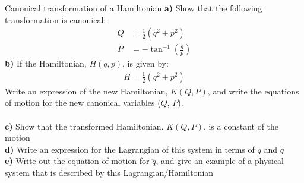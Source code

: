 \begin{problem}{Canonical transformation of a Hamiltonian}
\textbf{a)} Show that the following transformation is canonical:
\begin{align*}
Q&=\frac{1}{2}(q^2+p^2)\\
P&=-\tan^{-1}(\frac{q}{p})
\end{align*}
\textbf{b)} If the Hamiltonian, $H(q,p)$, is given by:
\begin{align*}
H=\frac{1}{2}(q^2+p^2)
\end{align*}
Write an expression of the new Hamiltonian, $K(Q,P)$, and write the equations of motion for the new canonical variables ($Q$, $P$).\\\\
\textbf{c)} Show that the transformed Hamiltonian, $K(Q,P)$, is a constant of the motion\\
\textbf{d)} Write an expression for the Lagrangian of this system in terms of $q$ and $\dot q$\\
\textbf{e)} Write out the equation of motion for $\ddot q$, and give an example of a physical system that is described by this Lagrangian/Hamiltonian
\label{prob_CT_5}
\end{problem}